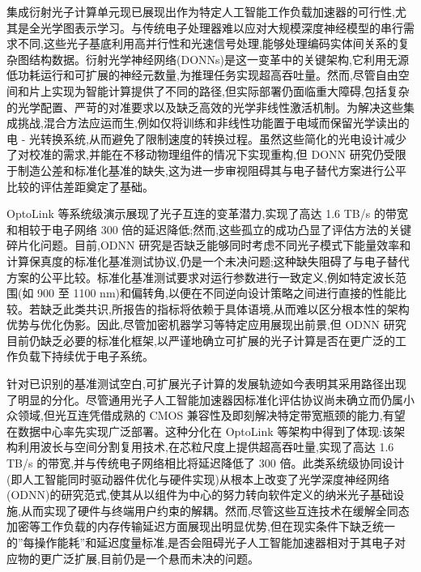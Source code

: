 \documentclass[11pt]{article}
\begin{document}
集成衍射光子计算单元现已展现出作为特定人工智能工作负载加速器的可行性,尤其是全光学图表示学习。与传统电子处理器难以应对大规模深度神经模型的串行需求不同,这些光子基底利用高并行性和光速信号处理,能够处理编码实体间关系的复杂图结构数据。衍射光学神经网络(DONNs)是这一变革中的关键架构,它利用无源低功耗运行和可扩展的神经元数量,为推理任务实现超高吞吐量。然而,尽管自由空间和片上实现为智能计算提供了不同的路径,但实际部署仍面临重大障碍,包括复杂的光学配置、严苛的对准要求以及缺乏高效的光学非线性激活机制。为解决这些集成挑战,混合方法应运而生,例如仅将训练和非线性功能置于电域而保留光学读出的电 - 光转换系统,从而避免了限制速度的转换过程。虽然这些简化的光电设计减少了对校准的需求,并能在不移动物理组件的情况下实现重构,但 DONN 研究仍受限于制造公差和标准化基准的缺失,这为进一步审视阻碍其与电子替代方案进行公平比较的评估差距奠定了基础。\citep{doi_10_1126_sciadv_abn7630_4399f2ff} \citep{doi_10_1002_nap2_70098_8d5f2f8a} \citep{doi_10_1364_oe_462370_1269b480}

OptoLink 等系统级演示展现了光子互连的变革潜力,实现了高达 1.6 TB/s 的带宽和相较于电子网络 300 倍的延迟降低;然而,这些孤立的成功凸显了评估方法的关键碎片化问题。目前,ODNN 研究是否缺乏能够同时考虑不同光子模式下能量效率和计算保真度的标准化基准测试协议,仍是一个未决问题;这种缺失阻碍了与电子替代方案的公平比较。标准化基准测试要求对运行参数进行一致定义,例如特定波长范围(如 900 至 1100 nm)和偏转角,以便在不同逆向设计策略之间进行直接的性能比较。若缺乏此类共识,所报告的指标将依赖于具体语境,从而难以区分根本性的架构优势与优化伪影。因此,尽管加密机器学习等特定应用展现出前景,但 ODNN 研究目前仍缺乏必要的标准化框架,以严谨地确立可扩展的光子计算是否在更广泛的工作负载下持续优于电子系统。\citep{doi_10_1145_3806395_315ab915} \citep{doi_10_1515_nanoph_2023_0852_cb27a26f} \citep{s2_9b444e84d20ae6e3d62d2d4df30268b5a53baad2_40af2cc9}

针对已识别的基准测试空白,可扩展光子计算的发展轨迹如今表明其采用路径出现了明显的分化。尽管通用光子人工智能加速器因标准化评估协议尚未确立而仍属小众领域,但光互连凭借成熟的 CMOS 兼容性及即刻解决特定带宽瓶颈的能力,有望在数据中心率先实现广泛部署。这种分化在 OptoLink 等架构中得到了体现:该架构利用波长与空间分割复用技术,在芯粒尺度上提供超高吞吐量,实现了高达 1.6 TB/s 的带宽,并与传统电子网络相比将延迟降低了 300 倍。此类系统级协同设计(即人工智能同时驱动器件优化与硬件实现)从根本上改变了光学深度神经网络(ODNN)的研究范式,使其从以组件为中心的努力转向软件定义的纳米光子基础设施,从而实现了硬件与终端用户约束的解耦。然而,尽管这些互连技术在缓解全同态加密等工作负载的内存传输延迟方面展现出明显优势,但在现实条件下缺乏统一的''每操作能耗''和延迟度量标准,是否会阻碍光子人工智能加速器相对于其电子对应物的更广泛扩展,目前仍是一个悬而未决的问题。\citep{doi_10_1145_3806395_315ab915} \citep{doi_10_1016_j_pquantelec_2023_100469_e4974ca6}
\end{document}
